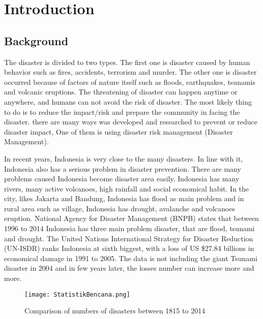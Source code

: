 \chapter{Introduction}
\section{Background}
The disaster is divided to two types. The first one is disaster caused by human behavior such as fires, accidents, terrorism and murder. The other one is disaster occurred because of factors of nature itself such as floods, earthquakes, tsunamis and volcanic eruptions. The threatening of disaster can happen anytime or anywhere, and humans  can not avoid the risk of disaster. The most likely thing to do is to reduce the impact/risk and prepare the community in facing the disaster. there are many ways was developed and researched to prevent or reduce disaster impact, One of them is using disaster risk management (Disaster Management).\par
In recent years, Indonesia is very close to the many disasters. In line with it, Indonesia also has a serious problem in disaster prevention. There are many problems caused Indonesia become disaster area easily. Indonesia has many rivers, many active volcanoes, high rainfall and social economical habit. In the city, likes Jakarta and Bandung, Indonesia has flood as main problem and in rural area such as village, Indonesia has drought, avalanche and volcanoes eruption.  National Agency for Disaster Management (BNPB) states that between 1996 to 2014 Indonesia has three main problem disaster, that are flood, tsunami and drought\cite{DataBNPB}. The United Nations International Strategy for Disaster Reduction (UN-ISDR) ranks Indonesia at sixth biggest, with a loss of US \$27.84 billions in economical damage in 1991 to 2005. The data is not including the giant Tsunami disaster in 2004 and in few years later, the losses number can increase more and more.\par

\begin{figure}[h!]
\centering
\texttt{[image: StatistikBencana.png]}
\caption{\small Comparison of numbers of disasters between 1815 to 2014\cite{DataBNPB}}
\label{fig:StatBen}
\end{figure}

